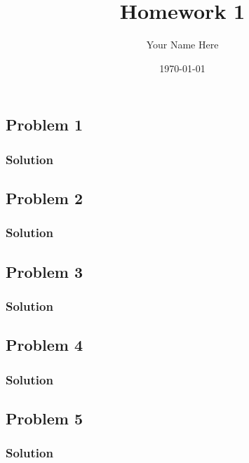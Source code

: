 \documentclass[12pt]{article}%
\begin{document}
\title{Homework 1}
\author{Your Name Here}
\date{\today}
\maketitle

\subsection*{Problem 1}
\subsubsection*{Solution}

\newpage
\subsection*{Problem 2}
\subsubsection*{Solution}
 
\newpage
\subsection*{Problem 3}
\subsubsection*{Solution}

\newpage
\subsection*{Problem 4}
\subsubsection*{Solution}

\newpage
\subsection*{Problem 5}

\subsubsection*{Solution}
\end{document}
